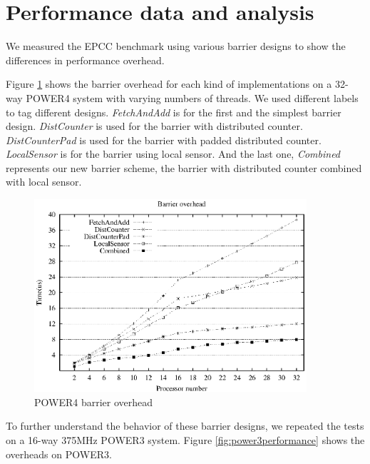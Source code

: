 
\section{Performance data and analysis}
\label{performance}

We measured the EPCC benchmark using various barrier designs to show
the differences in performance overhead. 


Figure \ref{fig:power4performance} shows the barrier overhead for each
kind of implementations on a 32-way POWER4 system with varying numbers
of threads. We used different labels to tag different designs.
\emph{FetchAndAdd} is for the first and the simplest barrier design.
\emph{DistCounter} is used for the barrier with distributed counter.
\emph{DistCounterPad} is used for the barrier with padded distributed
counter. \emph{LocalSensor} is for the barrier using local sensor. And
the last one, \emph{Combined} represents our new barrier scheme, the
barrier with distributed counter combined with local sensor.

\begin{figure}[!htbp]
  \begin{center}
    \includegraphics[angle=0, width=0.9\textwidth]{power4performance.eps}
    \caption{POWER4 barrier overhead}
    \label{fig:power4performance}
  \end{center}
\end{figure}

To further understand the behavior of these barrier designs, we
repeated the tests on a 16-way 375MHz POWER3 system.  Figure
\ref{fig:power3performance} shows the overheads on POWER3.

